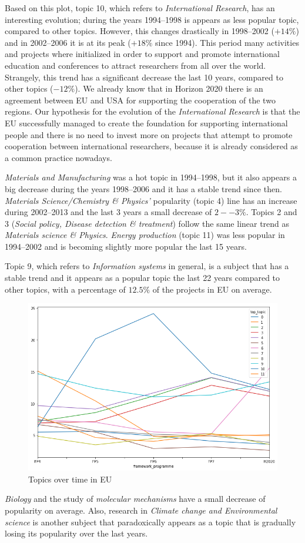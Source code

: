 \documentclass[12pt]{report}
\begin{document}
Based on this plot, topic 10, which refers to \emph{International Research},
has an interesting evolution; during the years 1994--1998 is appears as
less popular topic, compared to other topics. However, this changes
drastically in 1998--2002 ($+14\%$) and in 2002--2006 it is at its peak
($+18\%$ since 1994). This period
many activities and projects where initialized in order to support and
promote international education and conferences to attract researchers
from all over the world. Strangely, this trend has a significant
decrease the last 10 years, compared to other topics ($-12\%$). We
already know that in Horizon 2020 there is an agreement between EU and
USA for supporting the cooperation of the two regions. Our hypothesis
for the evolution of the \emph{International Research} is that the EU
successfully managed to create the foundation for supporting
international people and there is no need to invest more on projects
that attempt to promote cooperation between international researchers,
because it is already considered as a common practice nowadays.

\emph{Materials and Manufacturing} was a hot topic in 1994--1998, but it also
appears a big decrease during the years 1998--2006 and it has a stable
trend since then. \emph{Materials Science/Chemistry \& Physics'} popularity
(topic 4) line has an increase during 2002--2013 and the last 3 years a
small decrease of $2--3\%$. Topics 2 and 3 (\emph{Social policy, Disease
detection \& treatment}) follow the same linear trend as \emph{Materials
science \& Physics}. \emph{Energy production} (topic 11) was less popular in
1994--2002 and is becoming slightly more popular the last 15
years.

Topic 9, which refers to \emph{Information systems} in general, is a subject that has a
stable trend and it appears as a popular topic the last 22 years compared to
other topics, with a percentage of $12.5\%$ of the projects in EU on average.
\begin{figure}[H]
\includegraphics[width=1.0\textwidth]
{figs/eu-topic-evolution.png}
\caption{Topics over time in EU}
\label{eutrend}
\end{figure}
\emph{Biology} and the study of \emph{molecular mechanisms} have a small decrease of
popularity on average. Also,
research in \emph{Climate change and Environmental science} is another
subject that paradoxically appears as a topic that is gradually losing
its popularity over the last years.
\end{document}
